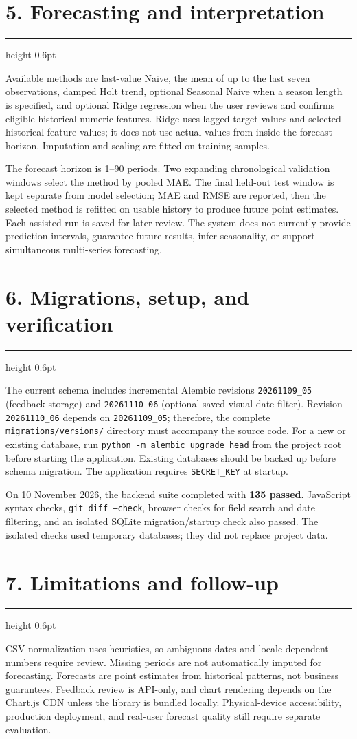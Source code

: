 \documentclass[11pt,a4paper]{article}
\newcommand{\sectiontitle}[1]{%
  \Needspace{5\baselineskip}\vspace{2pt}\section*{\color{brand}#1}\vspace{-5pt}\hrule height 0.6pt\vspace{7pt}
}
\begin{document}
\sectiontitle{5. Forecasting and interpretation}

Available methods are last-value Naive, the mean of up to the last seven
observations, damped Holt trend, optional Seasonal Naive when a season length is
specified, and optional Ridge regression when the user reviews and confirms
eligible historical numeric features. Ridge uses lagged target values and
selected historical feature values; it does not use actual values from inside
the forecast horizon. Imputation and scaling are fitted on training samples.

The forecast horizon is 1--90 periods. Two expanding chronological validation
windows select the method by pooled MAE. The final held-out test window is kept
separate from model selection; MAE and RMSE are reported, then the selected
method is refitted on usable history to produce future point estimates. Each
assisted run is saved for later review. The system does not currently provide
prediction intervals, guarantee future results, infer seasonality, or support
simultaneous multi-series forecasting.

\sectiontitle{6. Migrations, setup, and verification}

The current schema includes incremental Alembic revisions
\texttt{20261109\_05} (feedback storage) and \texttt{20261110\_06}
(optional saved-visual date filter). Revision \texttt{20261110\_06} depends on
\texttt{20261109\_05}; therefore, the complete
\texttt{migrations/versions/} directory must accompany the source code. For a
new or existing database, run \texttt{python -m alembic upgrade head} from the
project root before starting the application. Existing databases should be
backed up before schema migration. The application requires \texttt{SECRET\_KEY}
at startup.

On 10 November 2026, the backend suite completed with \textbf{135 passed}.
JavaScript syntax checks, \texttt{git diff --check}, browser checks for field
search and date filtering, and an isolated SQLite migration/startup check also
passed. The isolated checks used temporary databases; they did not replace
project data.

\sectiontitle{7. Limitations and follow-up}

CSV normalization uses heuristics, so ambiguous dates and locale-dependent
numbers require review. Missing periods are not automatically imputed for
forecasting. Forecasts are point estimates from historical patterns, not
business guarantees. Feedback review is API-only, and chart rendering depends
on the Chart.js CDN unless the library is bundled locally. Physical-device
accessibility, production deployment, and real-user forecast quality still
require separate evaluation.
\end{document}
